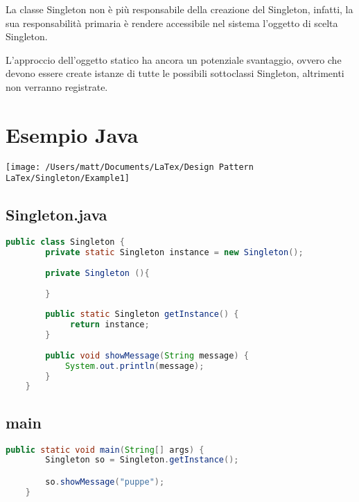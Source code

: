 La classe Singleton non è più responsabile della creazione del Singleton, infatti, la sua responsabilità primaria è rendere accessibile nel sistema l'oggetto di scelta Singleton.

L'approccio dell'oggetto statico ha ancora un potenziale svantaggio, ovvero che devono essere create istanze di tutte le possibili sottoclassi Singleton, altrimenti non verranno registrate.


\section{Esempio Java}
\texttt{[image: /Users/matt/Documents/LaTex/Design Pattern LaTex/Singleton/Example1]}

\subsection{Singleton.java}
\begin{lstlisting}[language=java]
    public class Singleton {
        private static Singleton instance = new Singleton();
    
        private Singleton (){
    
        }
    
        public static Singleton getInstance() {
             return instance;
        }
    
        public void showMessage(String message) {
            System.out.println(message);
        }
    }
\end{lstlisting}

\subsection{main}
\begin{lstlisting}[language=java]
    public static void main(String[] args) {
        Singleton so = Singleton.getInstance();

        so.showMessage("puppe");
    }
\end{lstlisting}